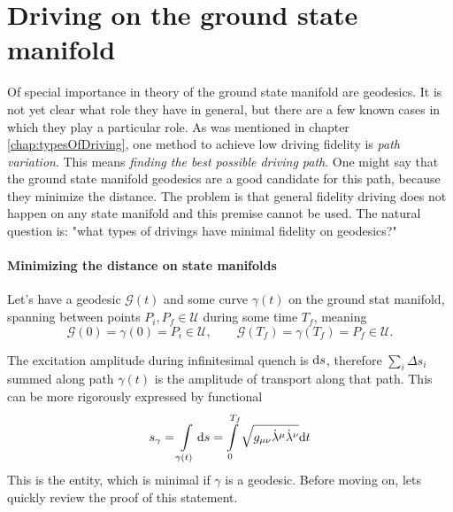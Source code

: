 \chapter{Driving on the ground state manifold}
\label{chap:groundStateManifoldDriving}
Of special importance in theory of the ground state manifold are geodesics. It is not yet clear what role they have in general, but there are a few known cases in which they play a particular role. As was mentioned in chapter \ref{chap:typesOfDriving}, one method to achieve low driving fidelity is \emph{path variation}. This means \emph{finding the best possible driving path}. One might say that the ground state manifold geodesics are a good candidate for this path, because they minimize the distance. The problem is that general fidelity driving does not happen on any state manifold and this premise cannot be used. The natural question is: "what types of drivings have minimal fidelity on geodesics?"


\subsubsection{Minimizing the distance on state manifolds}
Let's have a geodesic $\mathcal{G}(t)$ and some curve $\gamma(t)$ on the ground stat manifold, spanning between points $P_i,P_f\in \mathcal U$ during some time $T_f$, meaning
 $$\mathcal{G}(0)=\gamma(0)=P_i\in\mathcal U,\qquad \mathcal{G}(T_f)=\gamma(T_f)=P_f\in\mathcal U.$$

The excitation amplitude during infinitesimal quench is $\mathrm{d} s$, therefore $\sum_i \Delta s_i$ summed along path $\gamma(t)$ is the amplitude of transport along that path. This can be more rigorously expressed by functional
\begin{equation}
    s_\gamma=\int\limits_{\gamma(t)}\mathrm{d} s=\int\limits_{0}^{T_f}\sqrt{g_{\mu\nu}\dot\lambda^\mu\dot\lambda^\nu}\mathrm{d} t
\end{equation}
This is the entity, which is minimal if $\gamma$ is a geodesic. Before moving on, lets quickly review the proof of this statement.

